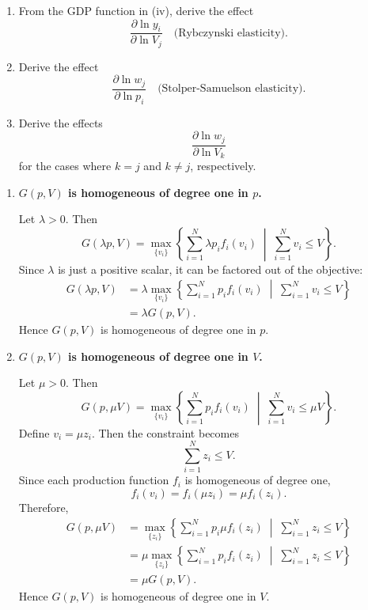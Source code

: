 \begin{tcolorbox}[breakable]
\begin{enumerate}
\item[(v)] From the GDP function in (iv), derive the effect
\[
\frac{\partial \ln y_i}{\partial \ln V_j}
\quad \text{(Rybczynski elasticity)}.
\]

\item[(vi)] Derive the effect
\[
\frac{\partial \ln w_j}{\partial \ln p_i}
\quad \text{(Stolper-Samuelson elasticity)}.
\]

\item[(vii)] Derive the effects
\[
\frac{\partial \ln w_j}{\partial \ln V_k}
\]
for the cases where \(k = j\) and \(k \neq j\), respectively.
\end{enumerate}

\end{tcolorbox}

\begin{enumerate}
\item[(i)] \textbf{$G(p,V)$ is homogeneous of degree one in $p$.}

Let $\lambda > 0$. Then
\[
G(\lambda p, V)
=
\max_{\{v_i\}}
\left\{
\sum_{i=1}^N \lambda p_i f_i(v_i)
\;\middle|\;
\sum_{i=1}^N v_i \le V
\right\}.
\]
Since $\lambda$ is just a positive scalar, it can be factored out of the objective:
\[
\begin{aligned}
G(\lambda p, V)
&=
\lambda
\max_{\{v_i\}}
\left\{
\sum_{i=1}^N p_i f_i(v_i)
\;\middle|\;
\sum_{i=1}^N v_i \le V
\right\}\\
&=
\lambda G(p,V).
\end{aligned}
\]
Hence $G(p,V)$ is homogeneous of degree one in $p$.

\bigskip

\item[(ii)] \textbf{$G(p,V)$ is homogeneous of degree one in $V$.}

Let $\mu > 0$. Then
\[
G(p,\mu V)
=
\max_{\{v_i\}}
\left\{
\sum_{i=1}^N p_i f_i(v_i)
\;\middle|\;
\sum_{i=1}^N v_i \le \mu V
\right\}.
\]
Define $v_i=\mu z_i$. Then the constraint becomes
\[
\sum_{i=1}^N z_i \le V.
\]
Since each production function $f_i$ is homogeneous of degree one,
\[
f_i(v_i)=f_i(\mu z_i)=\mu f_i(z_i).
\]
Therefore,
\[
\begin{aligned}
G(p,\mu V)
&=
\max_{\{z_i\}}
\left\{
\sum_{i=1}^N p_i \mu f_i(z_i)
\;\middle|\;
\sum_{i=1}^N z_i \le V
\right\}\\
&=
\mu
\max_{\{z_i\}}
\left\{
\sum_{i=1}^N p_i f_i(z_i)
\;\middle|\;
\sum_{i=1}^N z_i \le V
\right\}\\
&=
\mu G(p,V).
\end{aligned}
\]
Hence $G(p,V)$ is homogeneous of degree one in $V$.


\end{enumerate}
